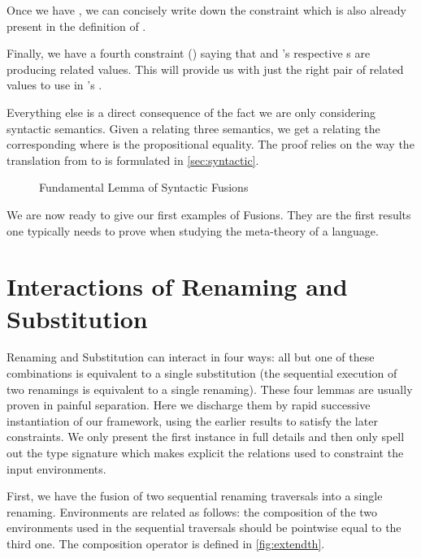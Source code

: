 Once we have , we can concisely write down the constraint  which is also already
present in the definition of .


Finally, we have a fourth constraint () saying that  and 's
respective s are producing related values. This will provide us with just the right
pair of related values to use in 's .


Everything else is a direct consequence of the fact we are only considering
syntactic semantics. Given a  relating three 
semantics, we get a  relating the corresponding  where
 is the propositional equality. The proof relies on the way the
translation from  to  is formulated in
\cref{sec:syntactic}.

\begin{figure}
\caption{Fundamental Lemma of Syntactic Fusions\label{fig:fundamentalsynfus}}
\end{figure}

We are now ready to give our first examples of Fusions. They are the first results one
typically needs to prove when studying the meta-theory of a language.

\section{Interactions of Renaming and Substitution}

Renaming and Substitution can interact in four ways: all but one of these
combinations is equivalent to a single substitution (the sequential execution
of two renamings is equivalent to a single renaming). These four lemmas are
usually proven in painful separation. Here we discharge them by rapid successive
instantiation of our framework, using the earlier results to satisfy the later
constraints. We only present the first instance in full details and then only
spell out the  type signature which makes explicit the relations
used to constraint the input environments.

First, we have the fusion of two sequential renaming traversals into a single
renaming. Environments are related as follows: the composition of the two
environments used in the sequential traversals should be pointwise equal to
the third one. The composition operator  is defined in \cref{fig:extendth}.

